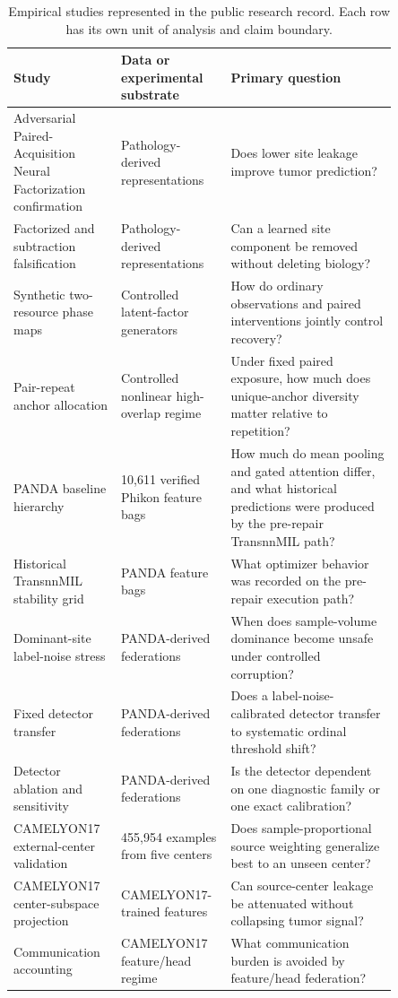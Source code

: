 \begin{table}[!htbp]
\centering
\caption{Empirical studies represented in the public research record. Each row has its own unit of analysis and claim boundary.}
\scriptsize
\begin{tabular}{p{0.25\linewidth}p{0.20\linewidth}p{0.40\linewidth}}
\toprule
Study & Data or experimental substrate & Primary question \\
\midrule
Adversarial Paired-Acquisition Neural Factorization confirmation & Pathology-derived representations & Does lower site leakage improve tumor prediction? \\
Factorized and subtraction falsification & Pathology-derived representations & Can a learned site component be removed without deleting biology? \\
Synthetic two-resource phase maps & Controlled latent-factor generators & How do ordinary observations and paired interventions jointly control recovery? \\
Pair-repeat anchor allocation & Controlled nonlinear high-overlap regime & Under fixed paired exposure, how much does unique-anchor diversity matter relative to repetition? \\
PANDA baseline hierarchy & 10,611 verified Phikon feature bags & How much do mean pooling and gated attention differ, and what historical predictions were produced by the pre-repair TransnnMIL path? \\
Historical TransnnMIL stability grid & PANDA feature bags & What optimizer behavior was recorded on the pre-repair execution path? \\
Dominant-site label-noise stress & PANDA-derived federations & When does sample-volume dominance become unsafe under controlled corruption? \\
Fixed detector transfer & PANDA-derived federations & Does a label-noise-calibrated detector transfer to systematic ordinal threshold shift? \\
Detector ablation and sensitivity & PANDA-derived federations & Is the detector dependent on one diagnostic family or one exact calibration? \\
CAMELYON17 external-center validation & 455,954 examples from five centers & Does sample-proportional source weighting generalize best to an unseen center? \\
CAMELYON17 center-subspace projection & CAMELYON17-trained features & Can source-center leakage be attenuated without collapsing tumor signal? \\
Communication accounting & CAMELYON17 feature/head regime & What communication burden is avoided by feature/head federation? \\

\end{tabular}
\end{table}
